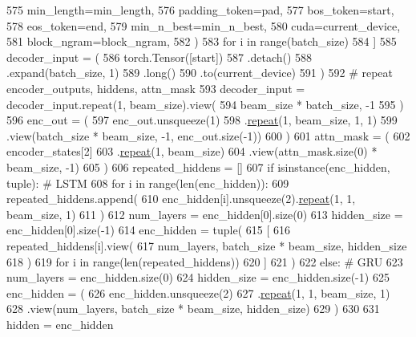 \begin{DoxyCode}
575                 min\_length=min\_length,
576                 padding\_token=pad,
577                 bos\_token=start,
578                 eos\_token=end,
579                 min\_n\_best=min\_n\_best,
580                 cuda=current\_device,
581                 block\_ngram=block\_ngram,
582             )
583             \textcolor{keywordflow}{for} i \textcolor{keywordflow}{in} range(batch\_size)
584         ]
585         decoder\_input = (
586             torch.Tensor([start])
587             .detach()
588             .expand(batch\_size, 1)
589             .long()
590             .to(current\_device)
591         )
592         \textcolor{comment}{# repeat encoder\_outputs, hiddens, attn\_mask}
593         decoder\_input = decoder\_input.repeat(1, beam\_size).view(
594             beam\_size * batch\_size, -1
595         )
596         enc\_out = (
597             enc\_out.unsqueeze(1)
598             .\hyperlink{namespacerepeat}{repeat}(1, beam\_size, 1, 1)
599             .view(batch\_size * beam\_size, -1, enc\_out.size(-1))
600         )
601         attn\_mask = (
602             encoder\_states[2]
603             .\hyperlink{namespacerepeat}{repeat}(1, beam\_size)
604             .view(attn\_mask.size(0) * beam\_size, -1)
605         )
606         repeated\_hiddens = []
607         \textcolor{keywordflow}{if} isinstance(enc\_hidden, tuple):  \textcolor{comment}{# LSTM}
608             \textcolor{keywordflow}{for} i \textcolor{keywordflow}{in} range(len(enc\_hidden)):
609                 repeated\_hiddens.append(
610                     enc\_hidden[i].unsqueeze(2).\hyperlink{namespacerepeat}{repeat}(1, 1, beam\_size, 1)
611                 )
612             num\_layers = enc\_hidden[0].size(0)
613             hidden\_size = enc\_hidden[0].size(-1)
614             enc\_hidden = tuple(
615                 [
616                     repeated\_hiddens[i].view(
617                         num\_layers, batch\_size * beam\_size, hidden\_size
618                     )
619                     \textcolor{keywordflow}{for} i \textcolor{keywordflow}{in} range(len(repeated\_hiddens))
620                 ]
621             )
622         \textcolor{keywordflow}{else}:  \textcolor{comment}{# GRU}
623             num\_layers = enc\_hidden.size(0)
624             hidden\_size = enc\_hidden.size(-1)
625             enc\_hidden = (
626                 enc\_hidden.unsqueeze(2)
627                 .\hyperlink{namespacerepeat}{repeat}(1, 1, beam\_size, 1)
628                 .view(num\_layers, batch\_size * beam\_size, hidden\_size)
629             )
630 
631         hidden = enc\_hidden

\end{DoxyCode}
